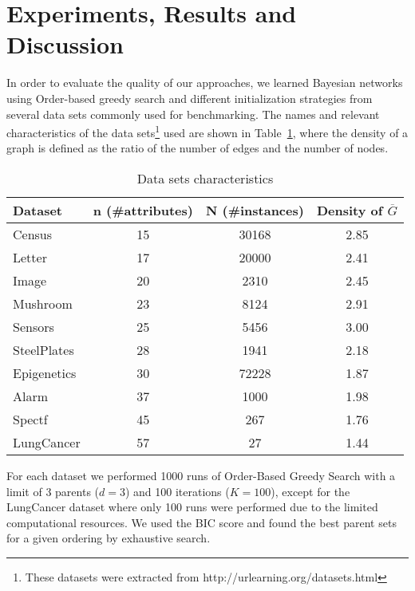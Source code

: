 \section{Experiments, Results and Discussion}
\label{sec:experiments}

In order to evaluate the quality of our approaches, we learned Bayesian networks using Order-based greedy search and different initialization strategies from several data sets commonly used for benchmarking. The names and relevant characteristics of the data sets\footnote{These datasets were extracted from http://urlearning.org/datasets.html} used are shown in Table~\ref{tab:datasets}, where the density of a graph is defined as the ratio of the number of edges and the number of nodes.
	\begin{table}[ h ]
		\centering
		\begin{tabular}{ | l | c | c | c | }
			\hline
			Dataset & n (\#attributes) & N (\#instances) & Density of $\overline G$ \\ \hline
			Census & 15 & 30168 & 2.85 \\ \hline
			Letter & 17 & 20000 & 2.41 \\ \hline
			Image & 20 & 2310 & 2.45 \\ \hline
			Mushroom & 23 & 8124 & 2.91 \\ \hline
			Sensors & 25 & 5456 & 3.00 \\ \hline
			SteelPlates & 28 & 1941 & 2.18 \\ \hline
			Epigenetics & 30 & 72228 & 1.87 \\ \hline
			Alarm & 37 & 1000 & 1.98 \\ \hline
			Spectf & 45 & 267 & 1.76 \\ \hline
			LungCancer & 57 & 27 & 1.44 \\ \hline
		\end{tabular}
		\caption{Data sets characteristics}
		\label{tab:datasets}
	\end{table}
For each dataset we performed 1000 runs of Order-Based Greedy Search with a limit of 3  parents ($d=3$) and 100 iterations ($K=100$), except for the  LungCancer dataset where only 100 runs were performed due to the limited computational resources. We used the BIC score and found the best parent sets for a given ordering by exhaustive search.

